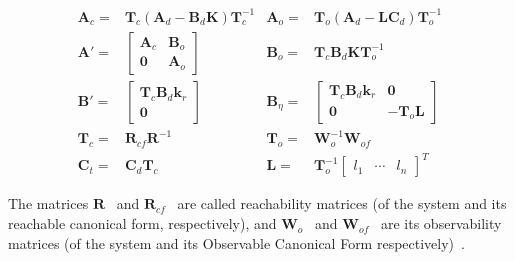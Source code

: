 \documentclass[sigconf]{llncs}
\newcommand{\mat}[1]{\boldsymbol{#1}}
\begin{document}
{%
\begin{align*}
\mat{A}_{c}=&\mat{T}_c\left(\mat{A}_d-\mat{B}_d\mat{K}\right)\mat{T}_c^{-1}&
\mat{A}_{o}=&\mat{T}_o\left(\mat{A}_d-\mat{L}\mat{C}_d\right)\mat{T}_o^{-1}\\
\mat{A}'=&\left [\begin{array}{cc}\mat{A}_{c}&\mat{B}_{o}\\ \mat{0}&\mat{A}_{o}\end{array}\right]&
\mat{B}_{o}=&\mat{T}_c\mat{B}_d\mat{K}\mat{T}_o^{-1}\\
\mat{B}'=&\left[\begin{array}{c}\mat{T}_c\mat{B}_d\mat{k}_r\\\mat{0}\end{array}\right]&
\mat{B}_{\eta}=&\left[\begin{array}{cc}\mat{T}_c\mat{B}_d\mat{k}_r&\mat{0}\\\mat{0}&-\mat{T}_o\mat{L}\end{array}\right]\\
\mat{T}_c=&\mat{R}_{cf}\mat{R}^{-1}&
\mat{T}_o=&\mat{W}_o^{-1}\mat{W}_{of}\\
\mat{C}_t=&\mat{C}_d\mat{T}_c&
\mat{L}=& \mat{T}_o^{-1}\left[ \begin{array}{ccc}l_1&\cdots&l_n\end{array}\right]^T
\end{align*}
}

The matrices $\mat{R}$%
~and $\mat{R}_{cf}$%
~are called reachability matrices (of the system and its reachable canonical form, respectively),
and $\mat{W}_o$%
~and $\mat{W}_{of}$%
~are its observability matrices  (of the system and its Observable Canonical Form respectively)~\cite{astrom1997computer}.
\end{document}
